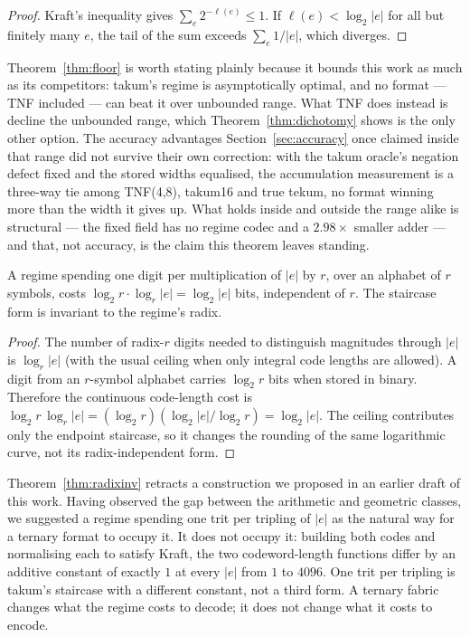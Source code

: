 \begin{proof}
Kraft's inequality gives $\sum_e 2^{-\ell(e)} \leq 1$. If $\ell(e) < \log_2|e|$
for all but finitely many $e$, the tail of the sum exceeds
$\sum_e 1/|e|$, which diverges.
\end{proof}

Theorem~\ref{thm:floor} is worth stating plainly because it bounds this work as
much as its competitors: takum's regime is asymptotically optimal, and no format
--- TNF included --- can beat it over unbounded range. What TNF does instead is
decline the unbounded range, which Theorem~\ref{thm:dichotomy} shows is the only
other option. The accuracy advantages Section~\ref{sec:accuracy} once claimed inside that
range did not survive their own correction: with the takum oracle's negation
defect fixed and the stored widths equalised, the accumulation measurement is
a three-way tie among TNF(4,8), takum16 and true tekum, no format winning more
than the width it gives up. What holds inside and outside the range alike is
structural --- the fixed field has no regime codec and a $2.98\times$ smaller
adder --- and that, not accuracy, is the claim this theorem leaves standing.

\begin{theorem}
\label{thm:radixinv}
A regime spending one digit per multiplication of $|e|$ by $r$, over an alphabet
of $r$ symbols, costs $\log_2 r \cdot \log_r |e| = \log_2 |e|$ bits, independent
of $r$. The staircase form is invariant to the regime's radix.
\end{theorem}
\begin{proof}
The number of radix-$r$ digits needed to distinguish magnitudes through $|e|$
is $\log_r|e|$ (with the usual ceiling when only integral code lengths are
allowed).  A digit from an $r$-symbol alphabet carries $\log_2r$ bits when
stored in binary.  Therefore the continuous code-length cost is
$\log_2r\,\log_r|e|=(\log_2r)(\log_2|e|/\log_2r)=\log_2|e|$.
The ceiling contributes only the endpoint staircase, so it changes the
rounding of the same logarithmic curve, not its radix-independent form.
\end{proof}

Theorem~\ref{thm:radixinv} retracts a construction we proposed in an earlier draft
of this work. Having observed the gap between the arithmetic and geometric
classes, we suggested a regime spending one trit per tripling of $|e|$ as the
natural way for a ternary format to occupy it. It does not occupy it: building
both codes and normalising each to satisfy Kraft, the two codeword-length
functions differ by an additive constant of exactly $1$ at every $|e|$ from $1$ to
$4096$. One trit per tripling is takum's staircase with a different constant, not
a third form. A ternary fabric changes what the regime costs to decode; it does
not change what it costs to encode.

